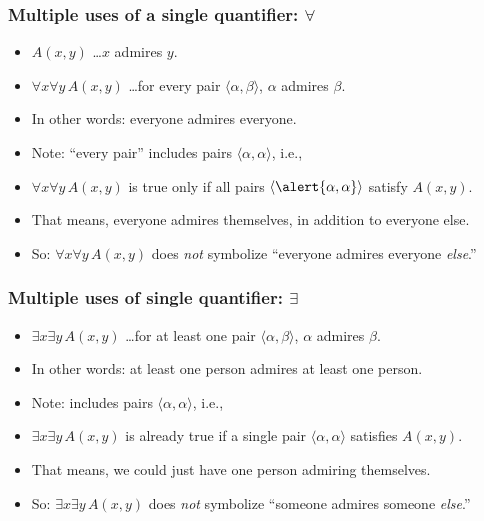 \begin{frame}
  \frametitle{Multiple uses of a single quantifier: $\forall$}

\begin{itemize}[<+->]
  \item $A(x, y)$ \dots $x$ admires $y$.
  \item $\forall x\forall y\, A(x, y)$ \dots for every pair $\langle
  \alpha,\beta\rangle$, $\alpha$ admires $\beta$.
  \item In other words: everyone admires everyone.
  \item Note: ``every pair'' includes pairs $\langle\alpha, \alpha\rangle$, i.e.,
  \item $\forall x\forall y\, A(x, y)$ is true only if all pairs $\langle \alert{\alpha, \alpha}\rangle$ satisfy $A(x, y)$.
  \item That means, everyone admires themselves, in addition to everyone else.
  \item So: $\forall x\forall y\, A(x, y)$ does \emph{not} symbolize ``everyone admires everyone \emph{else}.''
\end{itemize}

\end{frame}

\begin{frame}
  \frametitle{Multiple uses of single quantifier: $\exists$}

\begin{itemize}[<+->]
  \item $\exists x\exists y\, A(x, y)$ \dots for at least one pair $\langle \alpha,\beta\rangle$, $\alpha$ admires $\beta$.
  \item In other words: at least one person admires at least one person.
  \item Note: includes pairs $\langle\alpha, \alpha\rangle$, i.e.,
  \item $\exists x\exists y\, A(x, y)$ is already true if a single pair $\langle \alpha, \alpha\rangle$ satisfies $ A(x, y)$.
  \item That means, we could just have one person admiring themselves.
  \item So: $\exists x\exists y\, A(x, y)$ does \emph{not} symbolize ``someone admires someone \emph{else}.''
\end{itemize}
\end{frame}

